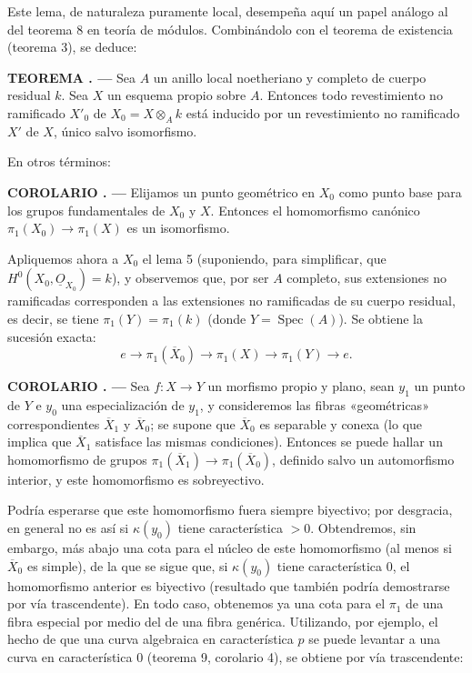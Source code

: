 \documentclass[11pt,twoside,openany]{book}
\numberwithin{equation}{section}
\newcommand{\src}[1]{%
  \phantomsection\hypertarget{src:#1}{}%
  \marginpar{\raggedleft\footnotesize\sffamily #1}%
}
\newcommand{\Osh}{\underline{O}}
\theoremstyle{plain}
\theoremstyle{definition}
\theoremstyle{remark}
\newcommand{\result}[2]{%
  \par\medskip\noindent\textbf{#1%
  \if\relax\detokenize{#2}\relax\else\space#2\fi. ---}\enspace
}
\newcommand{\FgaUnitKey}{frontmatter}
\renewcommand{\src}[1]{%
  \phantomsection\hypertarget{src:\FgaUnitKey:#1}{}%
  \marginpar{\raggedleft\footnotesize\sffamily #1}%
}
\theoremstyle{plain}
\theoremstyle{definition}
\theoremstyle{remark}
\begin{document}
Este lema, de naturaleza puramente local, desempeña aquí un papel análogo al del
teorema 8 en teoría de módulos. Combinándolo con el teorema de existencia
(teorema 3), se deduce:

\result{TEOREMA}{12} Sea $A$ un anillo local noetheriano y completo de cuerpo
residual $k$. Sea $X$ un esquema propio sobre $A$. Entonces todo revestimiento
no ramificado $X'_0$ de $X_0=X\otimes_A k$ está inducido por un revestimiento no
ramificado $X'$ de $X$, único salvo isomorfismo.

En otros términos:

\result{COROLARIO}{1} Elijamos un punto geométrico en $X_0$ como punto base para
los grupos fundamentales de $X_0$ y $X$. Entonces el homomorfismo canónico
$\pi_1(X_0)\longrightarrow\pi_1(X)$ es un isomorfismo.

Apliquemos ahora a $X_0$ el lema 5 (suponiendo, para simplificar, que
$H^0(X_0,\Osh_{X_0})=k$), y observemos que, por ser $A$ completo, sus
extensiones no ramificadas corresponden a las extensiones no ramificadas de su
cuerpo residual, es decir, se tiene $\pi_1(Y)=\pi_1(k)$ (donde
$Y=\operatorname{Spec}(A)$). Se obtiene la sucesión exacta:
\[
  e\longrightarrow\pi_1(\overline X_0)
  \longrightarrow\pi_1(X)\longrightarrow\pi_1(Y)\longrightarrow e.
\]

\result{COROLARIO}{2} Sea $f:X\longrightarrow Y$ un morfismo propio y plano,
sean $y_1$ un punto de $Y$ e $y_0$ una especialización de $y_1$, y consideremos
las fibras «geométricas» correspondientes $\overline X_1$ y $\overline X_0$;
se supone que $\overline X_0$ es separable y conexa (lo que implica que
$\overline X_1$ satisface las mismas condiciones). Entonces se puede hallar un
homomorfismo de grupos
$\pi_1(\overline X_1)\longrightarrow\pi_1(\overline X_0)$, definido salvo un
automorfismo interior, y este homomorfismo es sobreyectivo.

\src{217}
Podría esperarse que este homomorfismo fuera siempre biyectivo; por desgracia,
en general no es así si $\kappa(y_0)$ tiene característica $>0$. Obtendremos,
sin embargo, más abajo una cota para el núcleo de este homomorfismo (al menos si
$\overline X_0$ es simple), de la que se sigue que, si $\kappa(y_0)$ tiene
característica $0$, el homomorfismo anterior es biyectivo (resultado que también
podría demostrarse por vía trascendente). En todo caso, obtenemos ya una cota
para el $\pi_1$ de una fibra especial por medio del de una fibra genérica.
Utilizando, por ejemplo, el hecho de que una curva algebraica en característica
$p$ se puede levantar a una curva en característica $0$ (teorema 9, corolario
4), se obtiene por vía trascendente:
\end{document}
